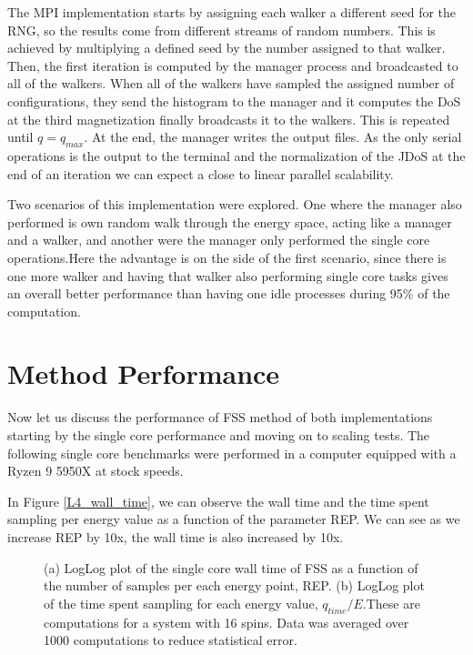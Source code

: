 	The MPI implementation starts by assigning each walker a different seed for the RNG, so the results come from different streams of random numbers. This is achieved by multiplying a defined seed by the number assigned to that walker. Then, the first iteration is computed by the manager process and broadcasted to all of the walkers. When all of the walkers have sampled the assigned number of configurations, they send the histogram to the manager and it computes the DoS at the third magnetization finally broadcasts it to the walkers. This is repeated until $q = q_{max}$. At the end, the manager writes the output files. As the only serial operations is the output to the terminal and the normalization of the JDoS at the end of an iteration we can expect a close to linear parallel scalability.

 
	Two scenarios of this implementation were explored. One where the manager also performed is own random walk through the energy space, acting like a manager and a walker, and another were the manager only performed the single core operations.Here the advantage is on the side of the first scenario, since there is one more walker and having that walker also performing single core tasks gives an overall better performance than having one idle processes during 95\% of the computation.
\pagebreak

\section{Method Performance}

	Now let us discuss the performance of FSS method of both implementations starting by the single core performance and moving on to scaling tests. The following single core benchmarks were performed in a computer equipped with a Ryzen 9 5950X at stock speeds.  
	
	In Figure \ref{L4_wall_time}, we can observe the wall time and the time spent sampling per energy value as a function of the parameter REP. We can see as we increase REP by 10x, the wall time is also increased by 10x.
	
\begin{figure}[ht]
\centering
{}
\quad
\quad
\quad
{}	

\caption{(a) LogLog plot of the single core wall time of FSS as a function of the number of samples per each energy point, REP.  (b) LogLog plot of the time spent sampling for each energy value, $q_{time}/E$.These are computations for a system with 16 spins. Data was averaged over 1000 computations to reduce statistical error.}
\label{wall_time_L4}
\end{figure}

